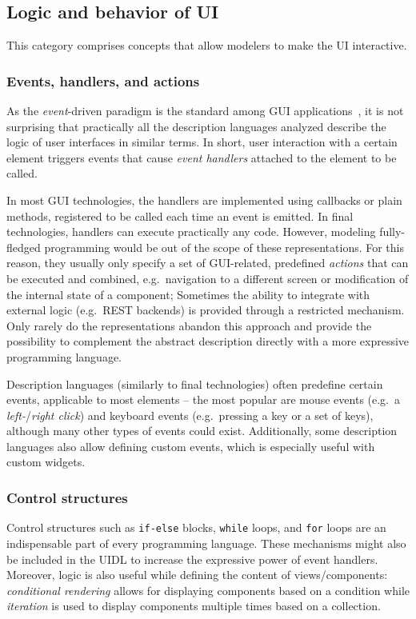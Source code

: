 \subsection{Logic and behavior of UI}\label{subsec:logic-and-behavior-of-ui}

This category comprises concepts that allow modelers to make the UI interactive.

\subsubsection{Events, handlers, and actions}
As the \emph{event}-driven paradigm is the standard among GUI applications~\cite{wang2016event}, it is not surprising that practically all the description languages analyzed describe the logic of user interfaces in similar terms.
In short, user interaction with a certain element triggers events that cause \emph{event handlers} attached to the element to be called.

In most GUI technologies, the handlers are implemented using callbacks or plain methods, registered to be called each time an event is emitted.
In final technologies, handlers can execute practically any code.
However, modeling fully-fledged programming would be out of the scope of these representations.
For this reason, they usually only specify a set of GUI-related, predefined \emph{actions} that can be executed and combined, e.g.\ navigation to a different screen or modification of the internal state of a component;
Sometimes the ability to integrate with external logic (e.g.\ REST backends) is provided through a restricted mechanism.
Only rarely do the representations abandon this approach and provide the possibility to complement the abstract description directly with a more expressive programming language.

Description languages (similarly to final technologies) often predefine certain events, applicable to most elements -- the most popular are mouse events (e.g.\ a \emph{left-}/\emph{right click}) and keyboard events (e.g.\ pressing a key or a set of keys), although many other types of events could exist.
Additionally, some description languages also allow defining custom events, which is especially useful with custom widgets.

\subsubsection{Control structures}
Control structures such as \texttt{if-else} blocks, \texttt{while} loops, and \texttt{for} loops are an indispensable part of every programming language.
These mechanisms might also be included in the UIDL to increase the expressive power of event handlers.
Moreover, logic is also useful while defining the content of views/components: \emph{conditional rendering} allows for displaying components based on a condition while \emph{iteration} is used to display components multiple times based on a collection.

